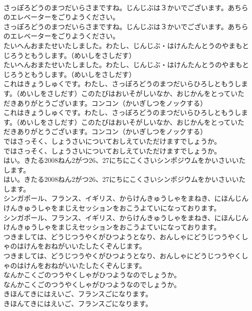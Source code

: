 \documentclass[8pt]{extreport}
\begin{document}
\begin{CJK}{UTF8}{min}
\\	さっぽろどうのまつだいらさまですね。じんじぶは３かいでございます。あちらのエレベーターをごりようください。
\\	さっぽろどうのまつだいらさまですね。じんじぶは３かいでございます。あちらのエレベーターをごりようください。
\\	たいへんおまたせいたしました。わたし、じんじぶ・はけんたんとうのやまもとじろうともうします。（めいしをさしだす）
\\	たいへんおまたせいたしました。わたし、じんじぶ・はけんたんとうのやまもとじろうともうします。（めいしをさしだす）
\\	これはきょうしゅくです。わたし、さっぽろどうのまつだいらひろしともうします。（めいしをさしだす）このたびはおいそがしいなか、おじかんをとっていただきありがとうございます。コンコン（かいぎしつをノックする）
\\	これはきょうしゅくです。わたし、さっぽろどうのまつだいらひろしともうします。（めいしをさしだす）このたびはおいそがしいなか、おじかんをとっていただきありがとうございます。コンコン（かいぎしつをノックする）
\\	ではさっそく、しょうさいについておしえていただけますでしょうか。
\\	ではさっそく、しょうさいについておしえていただけますでしょうか。
\\	はい。きたる2008ねん2がつ26、27にちにこくさいシンポジウムをかいさいいたします。
\\	はい。きたる2008ねん2がつ26、27にちにこくさいシンポジウムをかいさいいたします。
\\	シンガポール、フランス、イギリス、からけんきゅうしゃをまねき、にほんじんけんきゅうしゃをまじえセッションをおこうよていになっております。
\\	シンガポール、フランス、イギリス、からけんきゅうしゃをまねき、にほんじんけんきゅうしゃをまじえセッションをおこうよていになっております。
\\	つきましては、どうじつうやくがひつようとなり、おんしゃにどうじつうやくしゃのはけんをおねがいいたしたくぞんじます。
\\	つきましては、どうじつうやくがひつようとなり、おんしゃにどうじつうやくしゃのはけんをおねがいいたしたくぞんじます。
\\	なんかこくごのつうやくしゃがひつようなのでしょうか。
\\	なんかこくごのつうやくしゃがひつようなのでしょうか。
\\	きほんてきにはえいご、フランスごになります。
\\	きほんてきにはえいご、フランスごになります。

\end{CJK}
\end{document}
